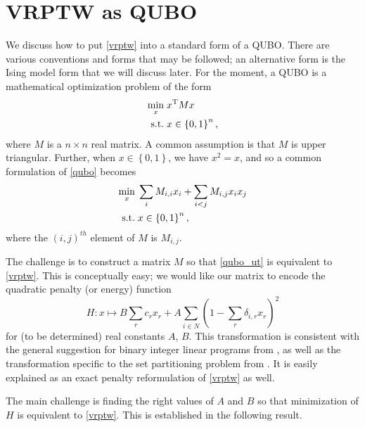 \documentclass[11pt]{article}
\theoremstyle{definition}
\newcommand{\st}{\mathrm{s.t.}\;}
\newcommand{\tr}{^{\mathrm{T}}}
\newcommand{\set}[1]{\left\{ #1 \right\}}
\newcommand{\smallsum}{{\textstyle{\sum}}}
\newcommand{\0}{\mathbf{0}}
\begin{document}
\section{VRPTW as QUBO}
We discuss how to put \eqref{vrptw} into a standard form of a QUBO.
There are various conventions and forms that may be followed;
an alternative form is the Ising model form that we will discuss later.
For the moment, a QUBO is a mathematical optimization problem of the form
\begin{align}
\label{qubo}
\min_x\; & x \tr M x\\
\st
\notag & x \in \set{0,1}^n,
\end{align}
where $M$ is a $n \times n$ real matrix.
A common assumption is that $M$ is upper triangular.
Further, when $x \in \set{0,1}$, we have $x^2 = x$, and so a common formulation of \eqref{qubo} becomes
\begin{align}
\label{qubo_ut}
\min_x\; & \sum_i M_{i,i} x_i + \sum_{i<j} M_{i,j} x_i x_j \\
\st
\notag & x \in \set{0,1}^n,
\end{align}
where the $(i,j)^{th}$ element of $M$ is $M_{i,j}$.

The challenge is to construct a matrix $M$ so that \eqref{qubo_ut} is equivalent to \eqref{vrptw}.
This is conceptually easy;
we would like our matrix to encode the quadratic penalty (or energy) function
\[
 H : x \mapsto B \sum_r c_r x_r + A \sum_{i \in N} (1 - \smallsum_r \delta_{i,r} x_r)^2
\]
for (to be determined) real constants $A$, $B$.
This transformation is consistent with the general suggestion for binary integer linear programs from \cite[\S3]{lucas14}, as well as the transformation specific to the set partitioning problem from \cite[\S4.1]{lucas14}.
It is easily explained as an exact penalty reformulation of \eqref{vrptw} as well.

The main challenge is finding the right values of $A$ and $B$ so that  
minimization of $H$ is equivalent to \eqref{vrptw}.
This is established in the following result.
\end{document}
